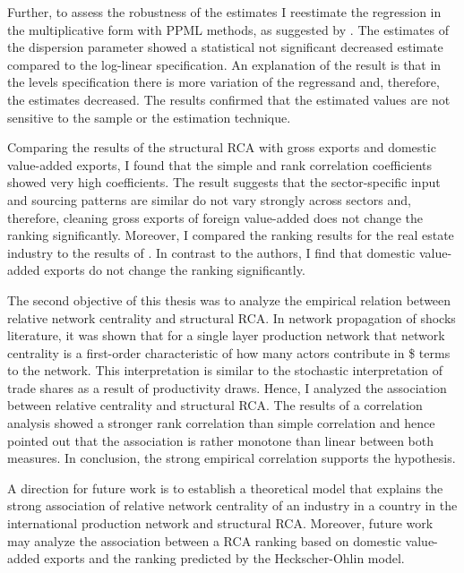  Further, to assess the robustness of the estimates I reestimate the regression in the multiplicative form with PPML methods, as suggested by \textcite{silva}. The  estimates of the dispersion parameter showed a statistical not significant decreased estimate compared to the log-linear specification. An explanation of the result is that in the levels specification there is more variation of the regressand and, therefore, the estimates decreased. The results confirmed that the estimated values are not sensitive to the sample or the estimation technique. \par 
Comparing the results of the structural RCA with gross exports and domestic value-added exports, I found that the simple and rank correlation coefficients showed very high coefficients. The result suggests that the sector-specific input and sourcing patterns are similar do not vary strongly across sectors and, therefore, cleaning gross exports of foreign value-added does not change the ranking significantly.  Moreover, I compared the ranking results for the real estate industry to the results of \textcite{Koopman}. In contrast to the authors, I find that domestic value-added exports do not change the ranking significantly. \par
 The second objective of this thesis was to analyze the empirical relation between relative network centrality and structural RCA.  In network propagation of shocks literature, it was shown that for a single layer production network that network centrality is a first-order characteristic of how many actors contribute in \$ terms to the network. This interpretation is similar to the stochastic interpretation of trade shares as a result of productivity draws.  Hence,  I  analyzed the association between relative centrality and structural RCA. The results of a correlation analysis showed a stronger rank correlation than simple correlation and hence pointed out that the association is rather monotone than linear between both measures. In conclusion, the strong empirical correlation supports the hypothesis. \par
  A direction for future work is to establish a theoretical model that explains the strong association of relative network centrality of an industry in a country in the international production network and structural RCA. Moreover, future work may analyze the association between a RCA ranking based on domestic value-added exports and the ranking predicted by the Heckscher-Ohlin model. 
\endinput